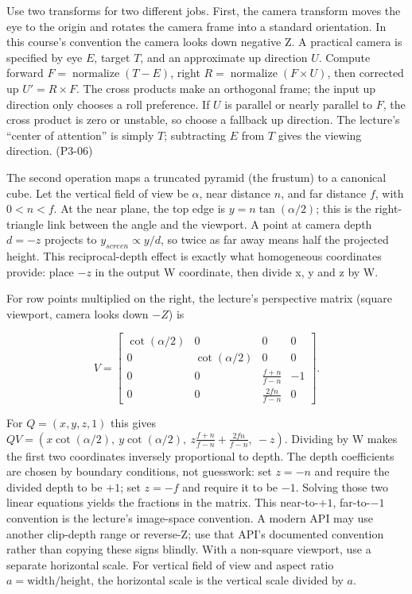 Use two transforms for two different jobs. First, the camera transform moves the eye to the origin and rotates the camera frame into a standard orientation. In this course's convention the camera looks down negative Z. A practical camera is specified by eye \(E\), target \(T\), and an approximate up direction \(U\). Compute forward \(F=\operatorname{normalize}(T-E)\), right \(R=\operatorname{normalize}(F\times U)\), then corrected up \(U'=R\times F\). The cross products make an orthogonal frame; the input up direction only chooses a roll preference. If \(U\) is parallel or nearly parallel to \(F\), the cross product is zero or unstable, so choose a fallback up direction. The lecture's ``center of attention'' is simply \(T\); subtracting \(E\) from \(T\) gives the viewing direction. (P3-06)

The second operation maps a truncated pyramid (the frustum) to a canonical cube. Let the vertical field of view be \(\alpha\), near distance \(n\), and far distance \(f\), with \(0<n<f\). At the near plane, the top edge is \(y=n\tan(\alpha/2)\); this is the right-triangle link between the angle and the viewport. A point at camera depth \(d=-z\) projects to \(y_{screen}\propto y/d\), so twice as far away means half the projected height. This reciprocal-depth effect is exactly what homogeneous coordinates provide: place \(-z\) in the output W coordinate, then divide x, y and z by W.

For row points multiplied on the right, the lecture's perspective matrix (square viewport, camera looks down \(-Z\)) is

\[
V=\begin{bmatrix}
\cot(\alpha/2)&0&0&0\\
0&\cot(\alpha/2)&0&0\\
0&0&\frac{f+n}{f-n}&-1\\
0&0&\frac{2fn}{f-n}&0
\end{bmatrix}.
\]

For \(Q=(x,y,z,1)\) this gives \(Q V=(x\cot(\alpha/2),\ y\cot(\alpha/2),\ z\frac{f+n}{f-n}+\frac{2fn}{f-n},\ -z)\). Dividing by W makes the first two coordinates inversely proportional to depth. The depth coefficients are chosen by boundary conditions, not guesswork: set \(z=-n\) and require the divided depth to be \(+1\); set \(z=-f\) and require it to be \(-1\). Solving those two linear equations yields the fractions in the matrix. This near-to-\(+1\), far-to-\(-1\) convention is the lecture's image-space convention. A modern API may use another clip-depth range or reverse-Z; use that API's documented convention rather than copying these signs blindly. With a non-square viewport, use a separate horizontal scale. For vertical field of view and aspect ratio \(a=\text{width}/\text{height}\), the horizontal scale is the vertical scale divided by \(a\).

